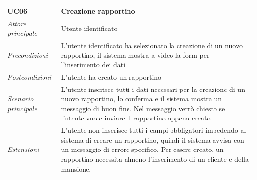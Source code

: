 		\begin{center}
			\begin{tabularx}{\textwidth}{p{3cm} p{9.30cm}}
				\hline
				\textbf{UC06} & \textbf{Creazione rapportino} \\
				\hline
				\textit{Attore principale} & Utente identificato\\
				\hline
				\textit{Precondizioni} & L’utente identificato ha selezionato la creazione di un nuovo rapportino, il sistema mostra a video la form per l’inserimento dei dati\\
				\hline
				\textit{Postcondizioni} & L’utente ha creato un rapportino\\
				\hline
				\textit{Scenario principale} & L’utente inserisce tutti i dati necessari per la creazione di un nuovo rapportino, lo conferma e il sistema mostra un messaggio di buon fine. Nel messaggio verrò chiesto se l’utente vuole inviare il rapportino appena creato.\\
				\hline
				\textit{Estensioni} & L’utente non inserisce tutti i campi obbligatori impedendo al sistema di creare un rapportino, quindi il sistema avvisa con un messaggio di errore specifico. Per essere creato, un rapportino necessita almeno l’inserimento di un cliente e della mansione.\\
				\hline
			\end{tabularx}
		\end{center}